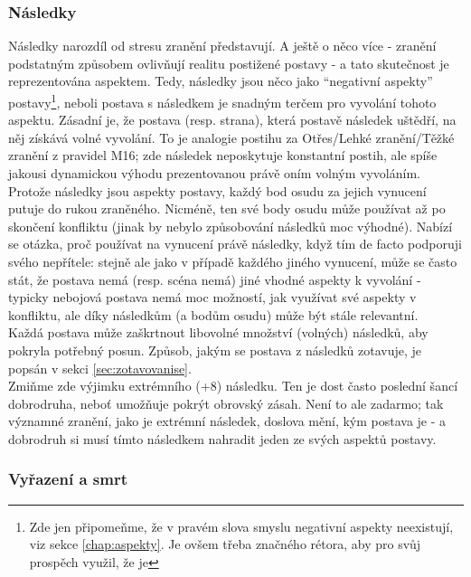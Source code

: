 \documentclass[../main.tex]{subfiles}
\begin{document}
\subsubsection{Následky}
\label{sec:následky}

Následky narozdíl od stresu zranění představují. A ještě o něco více - zranění podstatným způsobem ovlivňují realitu postižené postavy - a tato skutečnost je reprezentována aspektem. Tedy, následky jsou něco jako ``negativní aspekty'' postavy\footnote{Zde jen připomeňme, že v pravém slova smyslu negativní aspekty neexistují, viz sekce \ref{chap:aspekty}. Je ovšem třeba značného rétora, aby pro svůj prospěch využil, že je }, neboli postava s následkem je snadným terčem pro vyvolání tohoto aspektu. Zásadní je, že postava (resp. strana), která postavě následek uštědří, na něj získává volné vyvolání. To je analogie postihu za Otřes/Lehké zranění/Těžké zranění z pravidel M16; zde následek neposkytuje konstantní postih, ale spíše jakousi dynamickou výhodu prezentovanou právě oním volným vyvoláním.\\
Protože následky jsou aspekty postavy, každý bod osudu za jejich vynucení putuje do rukou zraněného. Nicméně, ten své body osudu může používat až po skončení konfliktu (jinak by nebylo způsobování následků moc výhodné). Nabízí se otázka, proč používat na vynucení právě následky, když tím de facto podporuji svého nepřítele: stejně ale jako v případě každého jiného vynucení, může se často stát, že postava nemá (resp. scéna nemá) jiné vhodné aspekty k vyvolání - typicky nebojová postava nemá moc možností, jak využívat své aspekty v konfliktu, ale díky následkům (a bodům osudu) může být stále relevantní.\\
Každá postava může zaškrtnout libovolné množství (volných) následků, aby pokryla potřebný posun. Způsob, jakým se postava z následků zotavuje, je popsán v sekci \ref{sec:zotavovanise}.\\
Zmiňme zde výjimku extrémního (+8) následku. Ten je dost často poslední šancí dobrodruha, neboť umožňuje pokrýt obrovský zásah. Není to ale zadarmo; tak významné zranění, jako je extrémní následek, doslova mění, kým postava je - a dobrodruh si musí tímto následkem nahradit jeden ze svých aspektů postavy.


\subsubsection{Vyřazení a smrt}
\label{sec:vyrazeniasmrt}
\end{document}
